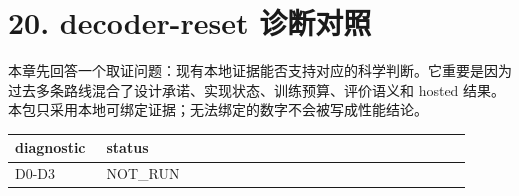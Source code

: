 \section{20. decoder-reset 诊断对照}

本章先回答一个取证问题：现有本地证据能否支持对应的科学判断。它重要是因为过去多条路线混合了设计承诺、实现状态、训练预算、评价语义和 hosted 结果。本包只采用本地可绑定证据；无法绑定的数字不会被写成性能结论。



\begin{longtable}{p{0.19\linewidth}p{0.19\linewidth}p{0.19\linewidth}p{0.19\linewidth}p{0.19\linewidth}}
\toprule
diagnostic & status\\
\midrule
D0-D3 & NOT\_RUN\\
\bottomrule
\end{longtable}



\clearpage